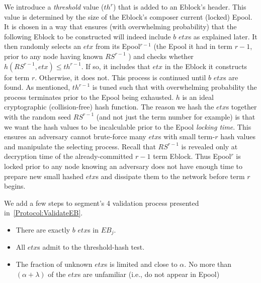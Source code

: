 We introduce a \emph{threshold} value ($th^r$) that is added to an Eblock's header. This value is determined by the size of the Eblock's composer current 
(locked) Epool. It is chosen in a way that ensures (with overwhelming probability) that the following Eblock to be constructed will indeed include $b$ $etx$s as explained later.
It then randomly selects an $etx$ from its Epool$^{r-1}$ (the Epool it had in term $r-1$, prior to any node having known $RS^{r-1}$ ) and checks whether $h(RS^{r-1},etx)\leq th^{r-1}$. If so, it includes that $etx$ in the Eblock it constructs for term $r$. Otherwise, it does not. This process is continued until $b$ $etx$s are found. As mentioned, $th^{r-1}$ is tuned such that with overwhelming probability the process terminates prior to the Epool being exhausted. $h$ is an ideal cryptographic (collision-free) hash function. 
The reason we hash the $etx$s together with the random seed $RS^{r-1}$ (and not just the term number for example) is that we want the hash values to be incalculable prior to the Epool \emph{locking time}. 
This ensures an adversary cannot brute-force many $etx$s with small term-$r$ hash values and manipulate the selecting process. Recall that $RS^{r-1}$ is revealed only at decryption time of the already-committed $r-1$ term Eblock. Thus Epool$^r$ is locked prior to any node knowing an adversary does not have enough time to prepare new small hashed $etx$s and dissipate them to the network before term $r$ begins.


We add a few steps to segment's 4 validation process presented in~\ref{Protocol:ValidateEB}.
\begin{itemize}
\item There are exactly $b$ $etx$s in $EB_j$.
\item All $etx$s admit to the threshold-hash test.
\item The fraction of unknown $etx$s is limited and close to $\alpha$. No more than $(\alpha+\lambda)$ of the $etx$s are unfamiliar (i.e., do not appear in Epool)
\end{itemize}

